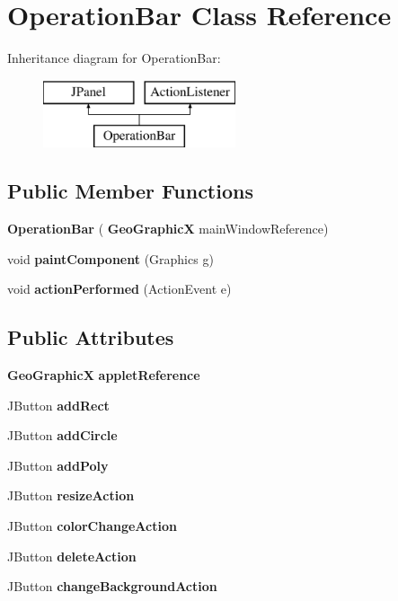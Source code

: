 \section{Operation\+Bar Class Reference}
\label{class_operation_bar}
Inheritance diagram for Operation\+Bar\+:\begin{figure}[H]
\begin{center}
\leavevmode
\includegraphics[height=2.000000cm]{class_operation_bar}
\end{center}
\end{figure}
\subsection*{Public Member Functions}
\begin{DoxyCompactItemize}
\item 
\textbf{ Operation\+Bar} (\textbf{ Geo\+GraphicX} main\+Window\+Reference)
\item 
\mbox{\label{class_operation_bar_a7030a65ba82068ab50bb059131ee8e05}} 
void {\bfseries paint\+Component} (Graphics g)
\item 
\mbox{\label{class_operation_bar_a0630107254ce3d8ca3845a4b885e89e2}} 
void {\bfseries action\+Performed} (Action\+Event e)
\end{DoxyCompactItemize}
\subsection*{Public Attributes}
\begin{DoxyCompactItemize}
\item 
\textbf{ Geo\+GraphicX} \textbf{ applet\+Reference}
\item 
J\+Button \textbf{ add\+Rect}
\item 
J\+Button \textbf{ add\+Circle}
\item 
J\+Button \textbf{ add\+Poly}
\item 
J\+Button \textbf{ resize\+Action}
\item 
J\+Button \textbf{ color\+Change\+Action}
\item 
J\+Button \textbf{ delete\+Action}
\item 
J\+Button \textbf{ change\+Background\+Action}
\end{DoxyCompactItemize}


